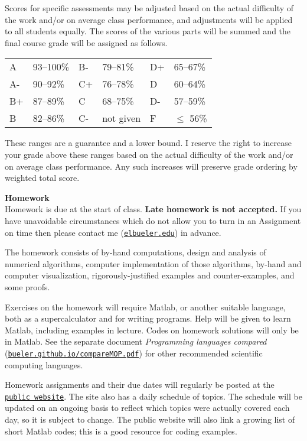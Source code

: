 \documentclass[12pt]{article}
\renewcommand{\emph}[1]{\textsf{\textbf{#1}}}
\newcommand{\localhead}[1]{\par\smallskip\textbf{#1} \smallskip\nobreak\\}%
\def\heading#1{\localhead{\large\emph{#1}}}
\begin{document}
Scores for specific assessments may be adjusted based on the actual difficulty of the work and/or on average class performance, and adjustments will be applied to all students equally.  The scores of the various parts will be summed and the final course grade will be assigned as follows.

\begin{tabular}{llllll}
A  & 93--100\% & B- & 79--81\%  & D+ & 65--67\%  \\
A- & 90--92\%  & C+ & 76--78\%  & D  & 60--64\%  \\
B+ & 87--89\%  & C  & 68--75\%  & D- & 57--59\%  \\
B  & 82--86\%  & C- & not given & F  & $\le$ 56\%
\end{tabular}

These ranges are a guarantee and a lower bound.  I reserve the right to increase your grade above these ranges based on the actual difficulty of the work and/or on average class performance.  Any such increases will preserve grade ordering by weighted total score.


\heading{Homework}
Homework is due at the start of class.  \emph{Late homework is not accepted.}  If you have unavoidable circumstances which do not allow you to turn in an Assignment on time then please contact me (\href{mailto:elbueler@alaska.edu}{\texttt{elbueler\@@alaska.edu}}) in advance.

The homework consists of by-hand computations, design and analysis of numerical algorithms, computer implementation of those algorithms, by-hand and computer visualization, rigorously-justified examples and counter-examples, and some proofs.

Exercises on the homework will require Matlab, or another suitable language, both as a supercalculator and for writing programs.  Help will be given to learn Matlab, including examples in lecture.  Codes on homework solutions will only be in Matlab.  See the separate document \textsl{Programming languages compared} (\href{https://bueler.github.io/compareMOP.pdf}{\texttt{bueler.github.io/compareMOP.pdf}}) for other recommended scientific computing languages.

Homework assignments and their due dates will regularly be posted at the \href{https://bueler.github.io/nade/}{\texttt{public website}}.  The site also has a daily schedule of topics.  The schedule will be updated on an ongoing basis to reflect which topics were actually covered each day, so it is subject to change.  The public website will also link a growing list of short Matlab codes; this is a good resource for coding examples.
\end{document}
